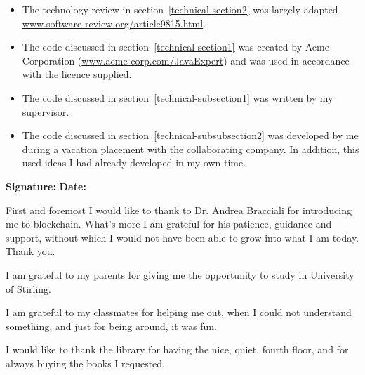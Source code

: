 \documentclass[a4paper,11pt]{report}
\begin{document}
\begin{itemize}

  \item
  The technology review in section~\ref{technical-section2} was largely adapted
  \url{www.software-review.org/article9815.html}.

  \item
  The code discussed in section~\ref{technical-section1} was created by Acme
  Corporation (\url{www.acme-corp.com/JavaExpert}) and was used in accordance
  with the licence supplied.

  \item
  The code discussed in section~\ref{technical-subsection1} was written by my
  supervisor.

  \item
  The code discussed in section~\ref{technical-subsubsection2} was developed by
  me during a vacation placement with the collaborating company. In addition,
  this used ideas I had already developed in my own time.

\end{itemize}

\bigskip

{\bf Signature:} \hspace{20em} {\bf Date:}




First and foremost I would like to thank to Dr. Andrea Bracciali for introducing me to blockchain. What's more I am grateful for his patience, guidance and support, without which I would not have been able to grow into what I am today. Thank you.

I am grateful to my parents for giving me the opportunity to study in University of Stirling. 

I am grateful to my classmates for helping me out, when I could not understand something, and just for being around, it was fun. 

I would like to thank the library for having the nice, quiet, fourth floor, and for always buying the books I requested. 


\tableofcontents

\listoffigures                

\end{document}
